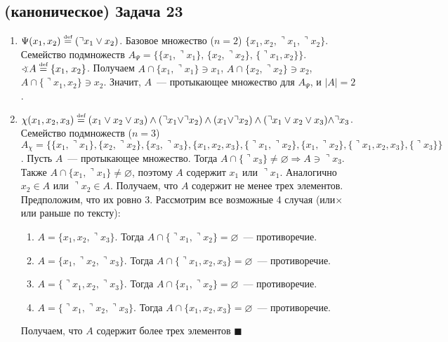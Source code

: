 \documentclass[a4paper]{article}
\def\eqdef{\overset{\mbox{\tiny def}}{=}}
\begin{document}
\subsection*{(каноническое) Задача 23}
\begin{enumerate}
\item $\Psi(x_1,x_2)\eqdef (\urcorner x_1\vee x_2)$. Базовое множество ($n=2$) $\{x_1,x_2,\urcorner x_1,\urcorner x_2\}$.\newline
Семейство подмножеств $A_\Psi=\big\{\{x_1,\urcorner x_1\},\,\{x_2,\urcorner x_2\},\,\{\urcorner x_1,x_2\}\big\}$.\newline
$\varangle A\eqdef\{x_1,\,x_2\}$. Получаем $A\cap\{x_1,\urcorner x_1\}\ni x_1$, $A\cap \{x_2,\urcorner x_2\}\ni x_2$, $A\cap \{\urcorner x_1, x_2\}\ni x_2$.\newline
Значит, $A$~--- протыкающее множество для $A_\Psi$, и $|A|=2$.
\item $\chi(x_1,x_2,x_3)\eqdef (x_1\vee x_2\vee x_3)\wedge(\urcorner x_1\vee \urcorner x_2)\wedge(x_1\vee \urcorner x_2)\wedge (\urcorner x_1\vee x_2\vee x_3)\wedge\urcorner x_3$. Семейство подмножеств ($n=3$) $A_\chi=\big\{\{x_1,\urcorner x_1\},\{x_2,\urcorner x_2\},\{x_3,\urcorner x_3\},\{x_1,x_2,x_3\},\{\urcorner x_1,\urcorner x_2\},\{x_1,\urcorner x_2\},\{\urcorner x_1,x_2,x_3\},\{\urcorner x_3\}\big\}$. Пусть $A$~--- протыкающее множество. Тогда $A\cap \{\urcorner x_3\}\neq \varnothing\Rightarrow A\ni \urcorner x_3$. Также $A\cap\{x_1,\urcorner x_1\}\neq\varnothing$, поэтому $A$ содержит $x_1$ или $\urcorner x_1$. Аналогично $x_2\in A$ или $\urcorner x_2\in A$. Получаем, что $A$ содержит не менее трех элементов. Предположим, что их ровно 3. Рассмотрим все возможные 4 случая (или$\times$или раньше по тексту):\begin{enumerate}
\item $A=\{x_1,x_2,\urcorner x_3\}$. Тогда $A\cap \{\urcorner x_1,\urcorner x_2\}=\varnothing$~--- противоречие.
\item $A=\{x_1,\urcorner x_2,\urcorner x_3\}$. Тогда $A\cap \{\urcorner x_1,x_2,x_3\}=\varnothing$~--- противоречие.
\item $A=\{\urcorner x_1,x_2,\urcorner x_3\}$. Тогда $A\cap \{x_1,\urcorner x_2\}=\varnothing$~--- противоречие.
\item $A=\{\urcorner x_1,\urcorner x_2,\urcorner x_3\}$. Тогда $A\cap\{x_1,x_2,x_3\}=\varnothing$~--- противоречие.
\end{enumerate}
Получаем, что $A$ содержит более трех элементов $\blacksquare$
\end{enumerate}
\end{document}
